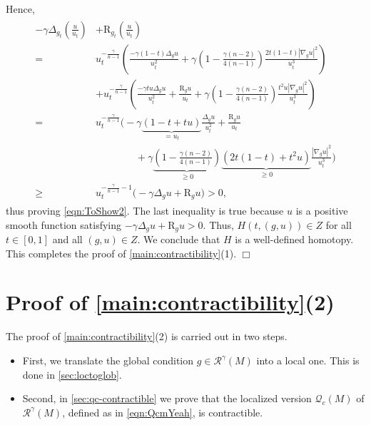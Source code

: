 \documentclass[11pt]{amsart}
\numberwithin{equation}{section}
\newcommand{\Riem}{\mathcal{R}}
\newcommand{\scal}{\mathrm{R}}
\newcommand{\Q}{\mathcal Q}
\let\ge\geqslant
\begin{document}
Hence,
\begin{align}
  \begin{split}
    -\gamma\Delta_{g_t}\left(\frac{u}{u_t}\right) &+ \scal_{g_t}\left(\frac{u}{u_t}\right)\\
      ={}&u_t^{-\frac{\gamma}{n-1}}\left( \frac{-\gamma(1-t)\Delta_g u}{u_t^2} + \gamma\left(1-\frac{\gamma(n-2)}{4(n-1)}\right)\frac{2t(1-t)|\nabla_gu|^2}{u_t^3}\right)  \\
      &+u_t^{-\frac{\gamma}{n-1}}\left( \frac{-\gamma tu\Delta_g u}{u_t^2} + \frac{\scal_{g}u}{u_t} + \gamma\left(1-\frac{\gamma(n-2)}{4(n-1)}\right)\frac{t^2u|\nabla_g u|^2}{u_t^3}\right)\\
      ={}&u_t^{-\frac{\gamma}{n-1}}
        \Biggl( -\gamma\underbrace{\left(1-t + tu\right)}_{=u_t}\frac{\Delta_g u}{u_t^2} + \frac{\scal_{g}u}{u_t}\\
        &\qquad\qquad+ \gamma \underbrace{\left(1-\frac{\gamma(n-2)}{4(n-1)}\right)}_{\ge0}\underbrace{(2t(1-t)+t^2 u)}_{\ge0}\frac{|\nabla_gu|^2}{u_t^3}\Biggr) \\
      \ge{}&u_t^{-\frac{\gamma}{n-1}-1}
      \big(-\gamma \Delta_g u +\scal_{g}u \big) >0,
  \end{split}
\end{align}
thus proving \eqref{eqn:ToShow2}.
The last inequality is true because $u$ is a positive smooth function satisfying $-\gamma \Delta_g u +\scal_{g}u>0$.
Thus, $H(t,(g,u))\in Z$ for all $t\in[0,1]$ and all $(g,u)\in Z$.
We conclude that $H$ is a well-defined homotopy. 
This completes the proof of \cref{main:contractibility}(1).
\hfill$\Box$

\section{Proof of \texorpdfstring{\cref{main:contractibility}}{Theorem A}(2)} 

The proof of \cref{main:contractibility}(2) is carried out in two steps. 
\begin{itemize}
    \item First, we translate the global condition $g\in\Riem^\gamma(M)$ into a local one. This is done in \cref{sec:loctoglob}.
    \item Second, in \cref{sec:qc-contractible} we prove that the localized version $\Q_c(M)$ of $\Riem^\gamma(M)$, defined as in \eqref{eqn:QcmYeah}, is contractible.
\end{itemize}
\end{document}
